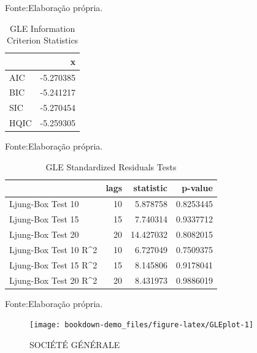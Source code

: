 \documentclass[
  12pt,
  a4paper,
  openany]{book}
\begin{document}
Fonte:Elaboração própria.

\justifying
\bigskip

\begin{table}[!h]

\caption{\label{tab:unnamed-chunk-27}GLE Information Criterion Statistics}
\centering
\begin{tabular}[t]{lr}
\toprule
  & x\\
\midrule
AIC & -5.270385\\
BIC & -5.241217\\
SIC & -5.270454\\
HQIC & -5.259305\\
\bottomrule
\end{tabular}
\end{table}
\FloatBarrier
\centering

Fonte:Elaboração própria.

\justifying
\bigskip

\begin{table}[!h]

\caption{\label{tab:unnamed-chunk-28}GLE Standardized Residuals Tests}
\centering
\begin{tabular}[t]{lrrr}
\toprule
  & lags & statistic & p-value\\
\midrule
Ljung-Box Test 10 & 10 & 5.878758 & 0.8253445\\
Ljung-Box Test 15 & 15 & 7.740314 & 0.9337712\\
Ljung-Box Test 20 & 20 & 14.427032 & 0.8082015\\
Ljung-Box Test 10 R\textasciicircum{}2 & 10 & 6.727049 & 0.7509375\\
Ljung-Box Test 15 R\textasciicircum{}2 & 15 & 8.145806 & 0.9178041\\
\addlinespace
Ljung-Box Test 20 R\textasciicircum{}2 & 20 & 8.431973 & 0.9886019\\
\bottomrule
\end{tabular}
\end{table}
\FloatBarrier
\centering

Fonte:Elaboração própria.

\justifying
\bigskip
\begin{figure}

{\centering \texttt{[image: bookdown-demo\_files/figure-latex/GLEplot-1]} 

}

\caption{SOCIÉTÉ GÉNÉRALE}\label{fig:GLEplot}
\end{figure}
\FloatBarrier
\centering
\end{document}
